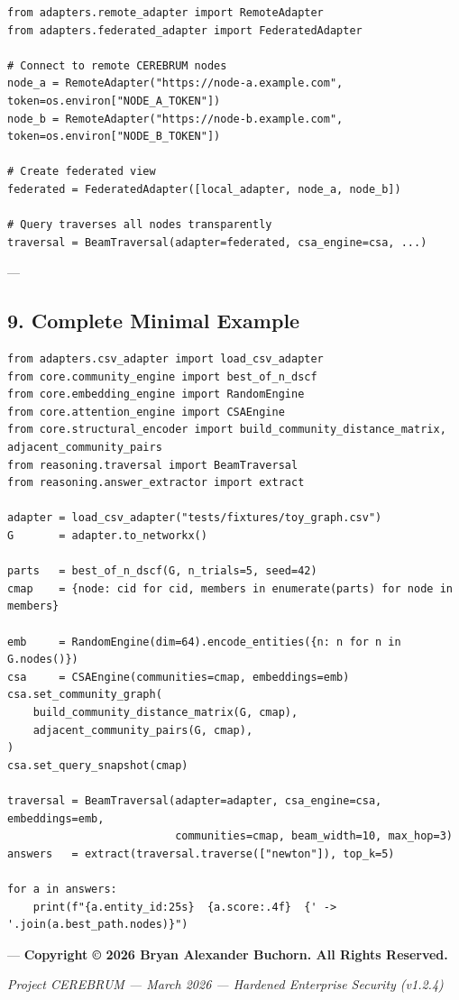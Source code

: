 \documentclass[11pt,article,oneside]{memoir}
\begin{document}
\begin{lstlisting}
from adapters.remote_adapter import RemoteAdapter
from adapters.federated_adapter import FederatedAdapter

# Connect to remote CEREBRUM nodes
node_a = RemoteAdapter("https://node-a.example.com", token=os.environ["NODE_A_TOKEN"])
node_b = RemoteAdapter("https://node-b.example.com", token=os.environ["NODE_B_TOKEN"])

# Create federated view
federated = FederatedAdapter([local_adapter, node_a, node_b])

# Query traverses all nodes transparently
traversal = BeamTraversal(adapter=federated, csa_engine=csa, ...)
\end{lstlisting}

---

\subsection{9. Complete Minimal Example}

\begin{lstlisting}
from adapters.csv_adapter import load_csv_adapter
from core.community_engine import best_of_n_dscf
from core.embedding_engine import RandomEngine
from core.attention_engine import CSAEngine
from core.structural_encoder import build_community_distance_matrix, adjacent_community_pairs
from reasoning.traversal import BeamTraversal
from reasoning.answer_extractor import extract

adapter = load_csv_adapter("tests/fixtures/toy_graph.csv")
G       = adapter.to_networkx()

parts   = best_of_n_dscf(G, n_trials=5, seed=42)
cmap    = {node: cid for cid, members in enumerate(parts) for node in members}

emb     = RandomEngine(dim=64).encode_entities({n: n for n in G.nodes()})
csa     = CSAEngine(communities=cmap, embeddings=emb)
csa.set_community_graph(
    build_community_distance_matrix(G, cmap),
    adjacent_community_pairs(G, cmap),
)
csa.set_query_snapshot(cmap)

traversal = BeamTraversal(adapter=adapter, csa_engine=csa, embeddings=emb,
                          communities=cmap, beam_width=10, max_hop=3)
answers   = extract(traversal.traverse(["newton"]), top_k=5)

for a in answers:
    print(f"{a.entity_id:25s}  {a.score:.4f}  {' -> '.join(a.best_path.nodes)}")
\end{lstlisting}

---
\textbf{Copyright © 2026 Bryan Alexander Buchorn. All Rights Reserved.}


\vspace{3em}
\begin{center}
    \small \textit{Project CEREBRUM — March 2026 — Hardened Enterprise Security (v1.2.4)}
\end{center}
\end{document}
